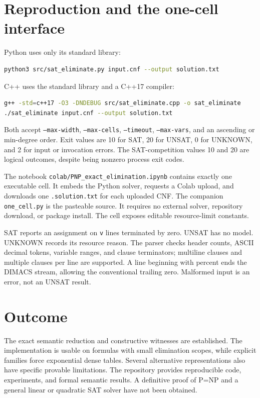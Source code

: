 \documentclass[11pt]{article}
\begin{document}
\section{Reproduction and the one-cell interface}
Python uses only its standard library:
\begin{lstlisting}[language=bash]
python3 src/sat_eliminate.py input.cnf --output solution.txt
\end{lstlisting}
C++ uses the standard library and a C++17 compiler:
\begin{lstlisting}[language=bash]
g++ -std=c++17 -O3 -DNDEBUG src/sat_eliminate.cpp -o sat_eliminate
./sat_eliminate input.cnf --output solution.txt
\end{lstlisting}
Both accept \texttt{--max-width}, \texttt{--max-cells},
\texttt{--timeout}, \texttt{--max-vars}, and an ascending or min-degree
order. Exit values are 10 for SAT, 20 for UNSAT, 0 for UNKNOWN, and 2 for
input or invocation errors. The SAT-competition values 10 and 20 are
logical outcomes, despite being nonzero process exit codes.

The notebook \texttt{colab/PNP\_exact\_elimination.ipynb} contains exactly
one executable cell. It embeds the Python solver, requests a Colab upload,
and downloads one \texttt{.solution.txt} for each uploaded CNF.
The companion \texttt{one\_cell.py} is the pasteable source.
It requires no external solver, repository download, or package install.
The cell exposes editable resource-limit constants.

SAT reports an assignment on \texttt{v} lines terminated by zero.
UNSAT has no model. UNKNOWN records its resource reason.
The parser checks header counts, ASCII decimal tokens, variable ranges,
and clause terminators; multiline clauses and multiple clauses per line
are supported. A line beginning with percent ends the DIMACS stream,
allowing the conventional trailing zero. Malformed input is an error,
not an UNSAT result.

\section{Outcome}
The exact semantic reduction and constructive witnesses are established.
The implementation is usable on formulas with small elimination scopes,
while explicit families force exponential dense tables.
Several alternative representations also have specific provable
limitations. The repository provides reproducible code, experiments,
and formal semantic results. A definitive proof of P=NP and a general
linear or quadratic SAT solver have not been obtained.
\end{document}
